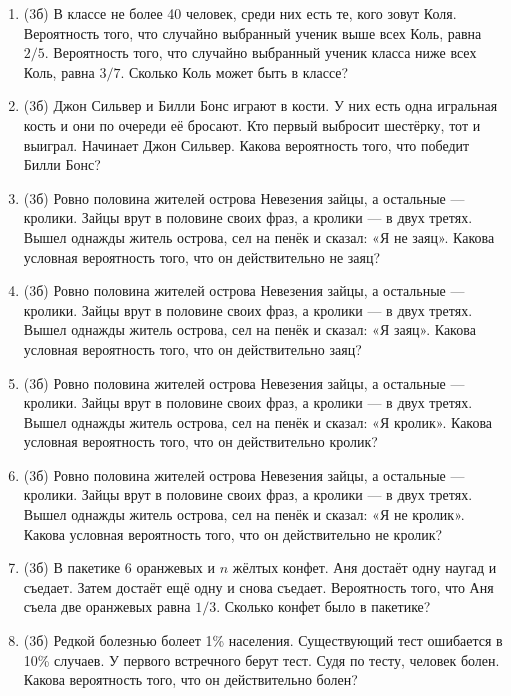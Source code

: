 \documentclass[a4paper, 12pt]{article}
\begin{document}
\newpage
\begin{enumerate}
\item (3б) В классе не более 40 человек, среди них есть те, кого зовут Коля. Вероятность того, что случайно выбранный ученик выше всех Коль, равна $2/5$. Вероятность того, что случайно выбранный ученик класса ниже всех Коль, равна $3/7$. Сколько Коль может быть в классе?
\item (3б) Джон Сильвер и Билли Бонс играют в кости. У них есть одна игральная кость и они по очереди её бросают. Кто первый выбросит шестёрку, тот и выиграл. Начинает Джон Сильвер. Какова вероятность того, что победит Билли Бонс?
\item (3б) Ровно половина жителей острова Невезения зайцы, а остальные — кролики. Зайцы врут в половине своих фраз, а кролики — в двух третях. Вышел однажды житель острова, сел на пенёк и сказал: «Я не заяц». Какова условная вероятность того, что он действительно не заяц?
\item (3б) Ровно половина жителей острова Невезения зайцы, а остальные — кролики. Зайцы врут в половине своих фраз, а кролики — в двух третях. Вышел однажды житель острова, сел на пенёк и сказал: «Я заяц». Какова условная вероятность того, что он действительно заяц?
\item (3б) Ровно половина жителей острова Невезения зайцы, а остальные — кролики. Зайцы врут в половине своих фраз, а кролики — в двух третях. Вышел однажды житель острова, сел на пенёк и сказал: «Я кролик». Какова условная вероятность того, что он действительно кролик?
\item (3б) Ровно половина жителей острова Невезения зайцы, а остальные — кролики. Зайцы врут в половине своих фраз, а кролики — в двух третях. Вышел однажды житель острова, сел на пенёк и сказал: «Я не кролик». Какова условная вероятность того, что он действительно не кролик?
\item (3б) В пакетике 6 оранжевых и $n$ жёлтых конфет. Аня достаёт одну наугад и съедает. Затем достаёт ещё одну и снова съедает. Вероятность того, что Аня съела две оранжевых равна $1/3$. Сколько конфет было в пакетике?
\item (3б) Редкой болезнью болеет 1\% населения. Существующий тест ошибается в 10\% случаев. У первого встречного берут тест. Судя по тесту, человек болен. Какова вероятность того, что он действительно болен?

\end{enumerate}
\end{document}
